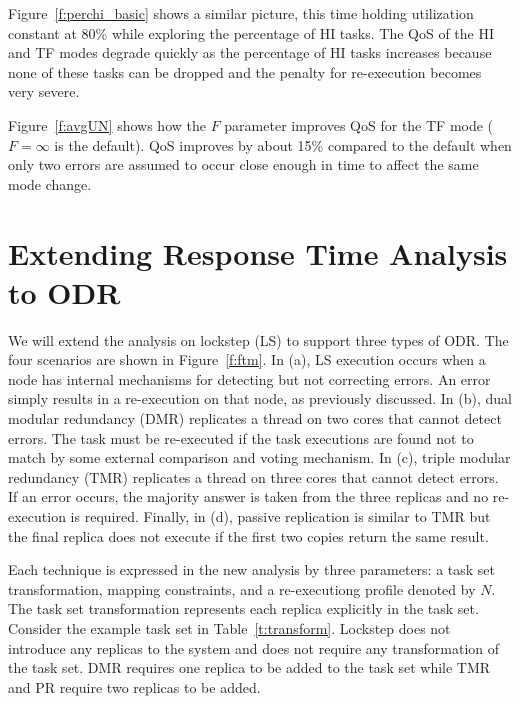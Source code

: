 	
	Figure~\ref{f:perchi_basic} shows a similar picture, this time holding utilization constant at 80\% while exploring the percentage of HI tasks. The QoS of the HI and TF modes degrade quickly as the percentage of HI tasks increases because none of these tasks can be dropped and the penalty for re-execution becomes very severe.
	 	
	Figure~\ref{f:avgUN} shows how the $F$ parameter improves QoS for the TF mode ($F=\infty$ is the default). QoS improves by about 15\% compared to the default when only two errors are assumed to occur close enough in time to affect the same mode change.

\section{Extending Response Time Analysis to ODR}

	We will extend the analysis on lockstep (LS) to support three types of ODR. The four scenarios are shown in Figure~\ref{f:ftm}. 
	In (a), LS execution occurs when a node has internal mechanisms for detecting but not correcting errors. 
	An error simply results in a re-execution on that node, as previously discussed. 	
	In (b), dual modular redundancy (DMR) replicates a thread on two cores that cannot detect errors. 
	The task must be re-executed if the task executions are found not to match by some external comparison and voting mechanism.
	In (c), triple modular redundancy (TMR) replicates a thread on three cores that cannot detect errors. 
	If an error occurs, the majority answer is taken from the three replicas and no re-execution is required.
	Finally, in (d), passive replication is similar to TMR but the final replica does not execute if the first two copies return the same result. 


	
	Each technique is expressed in the new analysis by three parameters: a task set transformation, mapping constraints, and a re-executiong profile denoted by $N$.
	The task set transformation represents each replica explicitly in the task set. 
	Consider the example task set in Table~\ref{t:transform}. 
	Lockstep does not introduce any replicas to the system and does not require any transformation of the task set. 
	DMR requires one replica to be added to the task set while TMR and PR require two replicas to be added.
	
